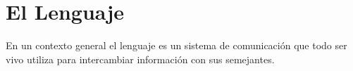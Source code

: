 \section{El Lenguaje}
En un contexto general el lenguaje es un sistema de comunicaci\'on que todo ser vivo
utiliza para intercambiar informaci\'on con sus semejantes.
